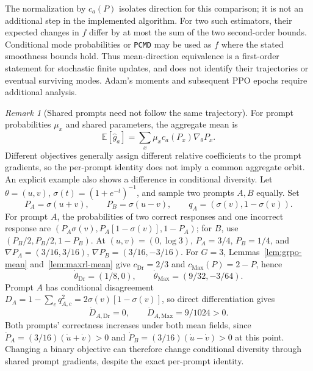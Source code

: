 \documentclass{article}
\newcommand{\1}{\mathbf 1}
\newcommand{\E}{\mathbb E}
\newcommand{\pmd}{\texttt{PCMD}}
\theoremstyle{remark}
\newtheorem{remark}[lemma]{Remark}
\theoremstyle{definition}
\theoremstyle{plain}
\begin{document}
The normalization by $c_a(P)$ isolates direction for this comparison; it is
not an additional step in the implemented algorithm. For two such estimators,
their expected changes in $f$ differ by at most the sum of the two
second-order bounds. Conditional mode probabilities or \pmd{} may be used
as $f$ where the stated smoothness bounds hold. Thus mean-direction
equivalence is a first-order statement for stochastic finite updates, and
does not identify their trajectories or eventual surviving modes. Adam's
moments and subsequent PPO epochs require additional analysis.

\begin{remark}[Shared prompts need not follow the same trajectory]
\label{rem:neural-binary-shared-prompts}
For prompt probabilities $\mu_x$ and shared parameters, the aggregate mean is
\begin{equation}
 \E[\widehat g_a]
 =\sum_x\mu_x c_a(P_x)\nabla_\theta P_x.
 \label{eq:neural-binary-prompt-sum}
\end{equation}
Different objectives generally assign different relative coefficients to
the prompt gradients, so the per-prompt identity does not imply a common
aggregate orbit. An explicit example also shows a difference in conditional
diversity. Let $\theta=(u,v)$, $\sigma(t)=(1+e^{-t})^{-1}$, and sample two
prompts $A,B$ equally. Set
\[
 P_A=\sigma(u+v),\qquad P_B=\sigma(u-v),\qquad
 q_A=(\sigma(v),1-\sigma(v)).
\]
For prompt $A$, the probabilities of two correct responses and one incorrect
response are $(P_A\sigma(v),P_A[1-\sigma(v)],1-P_A)$; for $B$, use
$(P_B/2,P_B/2,1-P_B)$. At $(u,v)=(0,\log3)$,
$P_A=3/4$, $P_B=1/4$, and
$\nabla P_A=(3/16,3/16)$, $\nabla P_B=(3/16,-3/16)$.
For $G=3$, Lemmas~\ref{lem:grpo-mean} and~\ref{lem:maxrl-mean} give
$c_{\mathrm{Dr}}=2/3$ and $c_{\mathrm{Max}}(P)=2-P$, hence
\[
 \dot\theta_{\mathrm{Dr}}=(1/8,0),\qquad
 \dot\theta_{\mathrm{Max}}=(9/32,-3/64).
\]
Prompt $A$ has conditional disagreement
$D_A=1-\sum_cq_{A,c}^2=2\sigma(v)[1-\sigma(v)]$, so direct
differentiation gives
\[
 \dot D_{A,\mathrm{Dr}}=0,\qquad
 \dot D_{A,\mathrm{Max}}=9/1024>0.
\]
Both prompts' correctness increases under both mean fields, since
$\dot P_A=(3/16)(\dot u+\dot v)>0$ and
$\dot P_B=(3/16)(\dot u-\dot v)>0$ at this point. Changing a binary
objective can therefore change conditional diversity through shared prompt
gradients, despite the exact per-prompt identity.
\end{remark}
\end{document}
